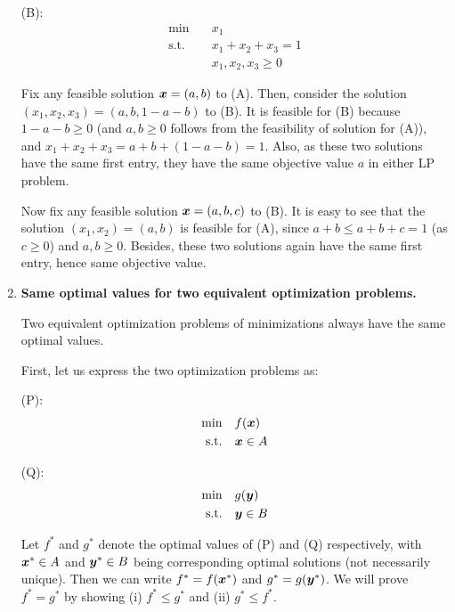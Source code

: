 \begin{enumerate}
(B): \begin{align*}
\text{min}\quad&x_1 \\
\text{s.t.}\quad&x_1+x_2+x_3=1\\
\quad&x_1,x_2,x_3\ge 0
\end{align*}

\begin{pf}
Fix any feasible solution \(\bm{x}=(a,b)\) to (A). Then, consider the
solution \((x_1,x_2,x_3)=(a,b,1-a-b)\) to (B). It is feasible for (B) because
\(1-a-b\ge 0\) (and \(a,b\ge 0\) follows from the feasibility of solution for
(A)), and \(x_1+x_2+x_3=a+b+(1-a-b)=1\). Also, as these two solutions have the
same first entry, they have the same objective value \(a\) in either LP problem.

Now fix any feasible solution \(\bm{x}=(a,b,c)\) to (B). It is easy to see
that the solution \((x_1,x_2)=(a,b)\) is feasible for (A), since \(a+b\le
a+b+c=1\) (as \(c\ge 0\)) and \(a,b\ge 0\). Besides, these two solutions again
have the same first entry, hence same objective value.
\end{pf}

\item \textbf{Same optimal values for two equivalent optimization problems.}
\begin{proposition}
\label{prp:equiv-optim-same-optim}
Two equivalent optimization problems of minimizations always have the same
optimal values.
\end{proposition}
\begin{pf}
First, let us express the two optimization problems as:

(P):
\begin{align*}
\text{min}\quad&f(\bm{x}) \\
\text{s.t.}\quad&\bm{x}\in A
\end{align*}

(Q):
\begin{align*}
\text{min}\quad&g(\bm{y}) \\
\text{s.t.}\quad&\bm{y}\in B
\end{align*}

Let \(f^*\) and \(g^*\) denote the optimal values of (P) and (Q) respectively,
with \(\bm{x}^*\in A\) and \(\bm{y}^*\in B\) being corresponding optimal
solutions (not necessarily unique). Then we can write \(f^*=f(\bm{x}^*)\) and
\(g^*=g(\bm{y}^*)\). We will prove \(f^*=g^*\) by showing (i) \(f^*\le g^*\) and
(ii) \(g^*\le f^*\).


\end{pf}
\end{enumerate}

